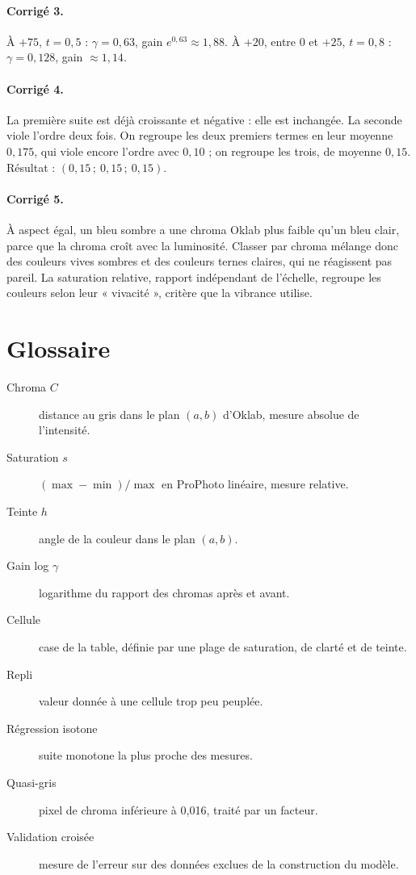 \paragraph{Corrigé 3.} À $+75$, $t=0{,}5$ : $\gamma=0{,}63$, gain $e^{0{,}63}\approx1{,}88$.
À $+20$, entre 0 et $+25$, $t=0{,}8$ : $\gamma=0{,}128$, gain $\approx1{,}14$.

\paragraph{Corrigé 4.} La première suite est déjà croissante et négative : elle
est inchangée. La seconde viole l'ordre deux fois. On regroupe les deux
premiers termes en leur moyenne $0{,}175$, qui viole encore l'ordre avec
$0{,}10$ ; on regroupe les trois, de moyenne $0{,}15$. Résultat :
$(0{,}15\,;\ 0{,}15\,;\ 0{,}15)$.

\paragraph{Corrigé 5.} À aspect égal, un bleu sombre a une chroma Oklab plus
faible qu'un bleu clair, parce que la chroma croît avec la luminosité. Classer
par chroma mélange donc des couleurs vives sombres et des couleurs ternes
claires, qui ne réagissent pas pareil. La saturation relative, rapport
indépendant de l'échelle, regroupe les couleurs selon leur « vivacité »,
critère que la vibrance utilise.

\section{Glossaire}
\begin{description}
\item[Chroma $C$] distance au gris dans le plan $(a,b)$ d'Oklab, mesure
absolue de l'intensité.
\item[Saturation $s$] $(\max-\min)/\max$ en ProPhoto linéaire, mesure relative.
\item[Teinte $h$] angle de la couleur dans le plan $(a,b)$.
\item[Gain log $\gamma$] logarithme du rapport des chromas après et avant.
\item[Cellule] case de la table, définie par une plage de saturation, de clarté
et de teinte.
\item[Repli] valeur donnée à une cellule trop peu peuplée.
\item[Régression isotone] suite monotone la plus proche des mesures.
\item[Quasi-gris] pixel de chroma inférieure à 0,016, traité par un facteur.
\item[Validation croisée] mesure de l'erreur sur des données exclues de la
construction du modèle.
\end{description}
